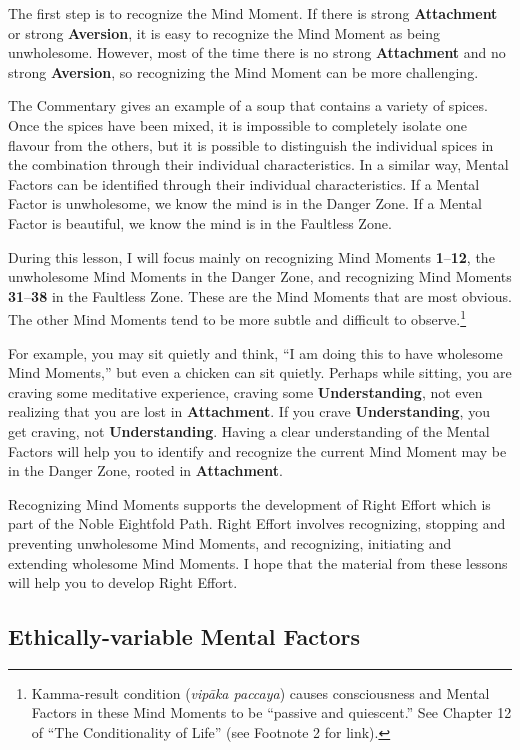 The first step is to recognize the Mind Moment. If there is strong \textbf{Attachment} or strong \textbf{Aversion}, it is easy to recognize the Mind Moment as being unwholesome. However, most of the time there is no strong \textbf{Attachment} and no strong \textbf{Aversion}, so recognizing the Mind Moment can be more challenging.

The Commentary gives an example of a soup that contains a variety of spices. Once the spices have been mixed, it is impossible to completely isolate one flavour from the others, but it is possible to distinguish the individual spices in the combination through their individual characteristics. In a similar way, Mental Factors can be identified through their individual characteristics. If a Mental Factor is unwholesome, we know the mind is in the Danger Zone. If a Mental Factor is beautiful, we know the mind is in the Faultless Zone.

During this lesson, I will focus mainly on recognizing Mind Moments \textbf{1}--\textbf{12}, the unwholesome Mind Moments in the Danger Zone, and recognizing Mind Moments \textbf{31}--\textbf{38} in the Faultless Zone. These are the Mind Moments that are most obvious. The other Mind Moments tend to be more subtle and difficult to observe.\footnote{Kamma-result condition (\textit{vipāka paccaya}) causes consciousness and Mental Factors in these Mind Moments to be “passive and quiescent.” See Chapter 12 of “The Conditionality of Life” (see Footnote 2 for link).}

For example, you may sit quietly and think, “I am doing this to have wholesome Mind Moments,” but even a chicken can sit quietly. Perhaps while sitting, you are craving some meditative experience, craving some \textbf{Understanding}, not even realizing that you are lost in \textbf{Attachment}. If you crave \textbf{Understanding}, you get craving, not \textbf{Understanding}. Having a clear understanding of the Mental Factors will help you to identify and recognize the current Mind Moment may be in the Danger Zone, rooted in \textbf{Attachment}.

Recognizing Mind Moments supports the development of Right Effort which is part of the Noble Eightfold Path. Right Effort involves recognizing, stopping and preventing unwholesome Mind Moments, and recognizing, initiating and extending wholesome Mind Moments. I hope that the material from these lessons will help you to develop Right Effort.

\subsection*{Ethically-variable Mental Factors}


